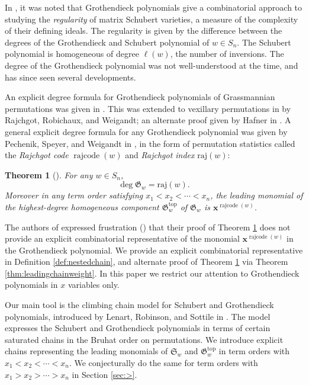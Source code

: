 \documentclass[11pt]{amsart}
\newtheorem{theorem}{Theorem}[section]
\theoremstyle{definition}
\theoremstyle{named}
\DeclareMathOperator{\rr}{\mathrm{rajcode}} %
\newcommand{\absrajcode}[1]{\mathrm{raj}(#1)}
\begin{document}
	In \cite{symmgrothdeg}, it was noted that Grothendieck polynomials give a combinatorial approach to studying the \emph{regularity} of matrix Schubert varieties, a measure of the complexity of their defining ideals. The regularity is given by the difference between the degrees of the Grothendieck and Schubert polynomial of $w\in S_n$. The Schubert polynomial is homogeneous of degree $\ell(w)$, the number of inversions. The degree of the Grothendieck polynomial was not well-understood at the time, and has since seen several developments.
	
	An explicit degree formula for Grothendieck polynomials of Grassmannian permutations was given in \cite{symmgrothdeg}. This was extended to vexillary permutations in \cite{vexgrothdeg} by Rajchgot, Robichaux, and Weigandt; an alternate proof given by Hafner in \cite{elena1}. A general explicit degree formula for any Grothendieck polynomial was given by Pechenik, Speyer, and Weigandt in \cite{PSW}, in the form of permutation statistics called the \emph{Rajchgot code} $\rr(w)$ and \emph{Rajchgot index} $\absrajcode{w}$:	
	\begin{theorem}[{\cite[Theorem 1.1]{PSW}}]
		\label{thm:pswleadingterm}
		For any $w\in S_n$,
		\[\deg \mathfrak{G}_w=\absrajcode{w}.\]
		Moreover in any term order satisfying $x_1<x_2<\cdots<x_n$, the leading monomial of the highest-degree homogeneous component $\mathfrak{G}_w^{\mathrm{top}}$ of $\mathfrak{G}_w$ is $\bm{x}^{\rr(w)}$.
	\end{theorem}
	The authors of \cite{PSW} expressed frustration (\cite[Remark 7.2]{PSW}) that their proof of Theorem \ref{thm:pswleadingterm} does not provide an explicit combinatorial representative of the monomial $\bm{x}^{\rr(w)}$ in the Grothendieck polynomial. We provide an explicit combinatorial representative in Definition \ref{def:nestedchain}, and alternate proof of Theorem \ref{thm:pswleadingterm} via Theorem \ref{thm:leadingchainweight}. In this paper we restrict our attention to Grothendieck polynomials in $x$ variables only. 
	
	Our main tool is the climbing chain model for Schubert and Grothendieck polynomials, introduced by Lenart, Robinson, and Sottile in \cite{LRS}. The model expresses the Schubert and Grothendieck polynomials in terms of certain saturated chains in the Bruhat order on permutations. We introduce explicit chains representing the leading monomials of $\mathfrak{S}_w$ and $\mathfrak{G}_w^{\mathrm{top}}$ in term orders with $x_1<x_2<\cdots<x_n$. We conjecturally do the same for term orders with $x_1>x_2>\cdots>x_n$ in Section \ref{sec:>}. 
	
\end{document}
